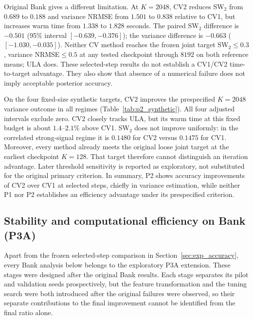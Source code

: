 Original Bank gives a different limitation. At $K=2048$, CV2 reduces SW$_2$ from $0.689$ to $0.188$ and variance NRMSE from $1.501$ to $0.838$ relative to CV1, but increases warm time from $1.338$ to $1.828$ seconds. The paired SW$_2$ difference is $-0.501$ (95\% interval $[-0.639,-0.376]$); the variance difference is $-0.663$ ($[-1.030,-0.035]$). Neither CV method reaches the frozen joint target SW$_2\leq0.3$, variance NRMSE$\leq0.5$ at any tested checkpoint through $8192$ on both reference means; ULA does. These selected-step results do not establish a CV1/CV2 time-to-target advantage. They also show that absence of a numerical failure does not imply acceptable posterior accuracy.

On the four fixed-size synthetic targets, CV2 improves the prespecified $K=2048$ variance outcome in all regimes (Table~\ref{tab:p2_synthetic}). All four adjusted intervals exclude zero. CV2 closely tracks ULA, but its warm time at this fixed budget is about $1.4$--$2.1\%$ above CV1. SW$_2$ does not improve uniformly: in the correlated strong-signal regime it is $0.1480$ for CV2 versus $0.1475$ for CV1. Moreover, every method already meets the original loose joint target at the earliest checkpoint $K=128$. That target therefore cannot distinguish an iteration advantage. Later threshold sensitivity is reported as exploratory, not substituted for the original primary criterion. In summary, P2 shows accuracy improvements of CV2 over CV1 at selected steps, chiefly in variance estimation, while neither P1 nor P2 establishes an efficiency advantage under its prespecified criterion.


\subsection{Stability and computational efficiency on Bank (P3A)}\label{sec:exp_bank}
Apart from the frozen selected-step comparison in Section~\ref{sec:exp_accuracy}, every Bank analysis below belongs to the exploratory P3A extension. These stages were designed after the original Bank results. Each stage separates its pilot and validation seeds prospectively, but the feature transformation and the tuning search were both introduced after the original failures were observed, so their separate contributions to the final improvement cannot be identified from the final ratio alone.

